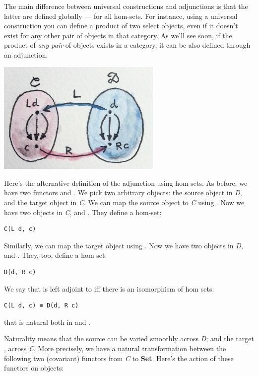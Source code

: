 The main difference between universal constructions and adjunctions is
that the latter are defined globally --- for all hom-sets. For instance,
using a universal construction you can define a product of two select
objects, even if it doesn't exist for any other pair of objects in that
category. As we'll see soon, if the product of \emph{any pair} of
objects exists in a category, it can be also defined through an
adjunction.

\includegraphics[width=3.12500in]{images/adj-homsets.jpg}

Here's the alternative definition of the adjunction using hom-sets. As
before, we have two functors  and
. We pick two arbitrary objects: the
source object  in \emph{D}, and the target object 
in \emph{C}. We can map the source object  to \emph{C} using
. Now we have two objects in \emph{C},  and
. They define a hom-set:

\begin{verbatim}
C(L d, c)
\end{verbatim}

Similarly, we can map the target object  using . Now
we have two objects in \emph{D},  and . They,
too, define a hom set:

\begin{verbatim}
D(d, R c)
\end{verbatim}

We say that  is left adjoint to  iff there is an
isomorphism of hom sets:

\begin{verbatim}
C(L d, c) ≅ D(d, R c)
\end{verbatim}

that is natural both in  and .

Naturality means that the source  can be varied smoothly
across \emph{D}; and the target , across \emph{C}. More
precisely, we have a natural transformation  between the
following two (covariant) functors from \emph{C} to \textbf{Set}. Here's
the action of these functors on objects:

